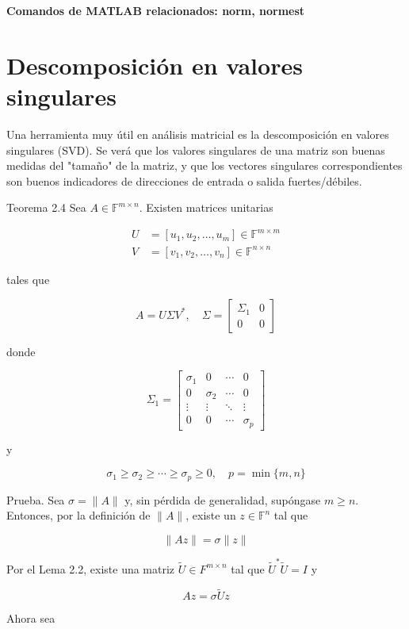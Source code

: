 \textbf{Comandos de MATLAB relacionados: norm, normest}

\section{Descomposición en valores singulares}
Una herramienta muy útil en análisis matricial es la descomposición en valores singulares (SVD). Se verá que los valores singulares de una matriz son buenas medidas del "tamaño" de la matriz, y que los vectores singulares correspondientes son buenos indicadores de direcciones de entrada o salida fuertes/débiles.

Teorema 2.4 Sea $A \in \mathbb{F}^{m \times n}$. Existen matrices unitarias

$$
\begin{aligned}
U & =\left[u_{1}, u_{2}, \ldots, u_{m}\right] \in \mathbb{F}^{m \times m} \\
V & =\left[v_{1}, v_{2}, \ldots, v_{n}\right] \in \mathbb{F}^{n \times n}
\end{aligned}
$$

tales que

$$
A=U \Sigma V^{*}, \quad \Sigma=\left[\begin{array}{cc}
\Sigma_{1} & 0 \\
0 & 0
\end{array}\right]
$$

donde

$$
\Sigma_{1}=\left[\begin{array}{cccc}
\sigma_{1} & 0 & \cdots & 0 \\
0 & \sigma_{2} & \cdots & 0 \\
\vdots & \vdots & \ddots & \vdots \\
0 & 0 & \cdots & \sigma_{p}
\end{array}\right]
$$

y

$$
\sigma_{1} \geq \sigma_{2} \geq \cdots \geq \sigma_{p} \geq 0, \quad p=\min \{m, n\}
$$

Prueba. Sea $\sigma=\|A\|$ y, sin pérdida de generalidad, supóngase $m \geq n$. Entonces, por la definición de $\|A\|$, existe un $z \in \mathbb{F}^{n}$ tal que

$$
\|A z\|=\sigma\|z\|
$$

Por el Lema 2.2, existe una matriz $\tilde{U} \in F^{m \times n}$ tal que $\tilde{U}^{*} \tilde{U}=I$ y

$$
A z=\sigma \tilde{U} z
$$

Ahora sea

